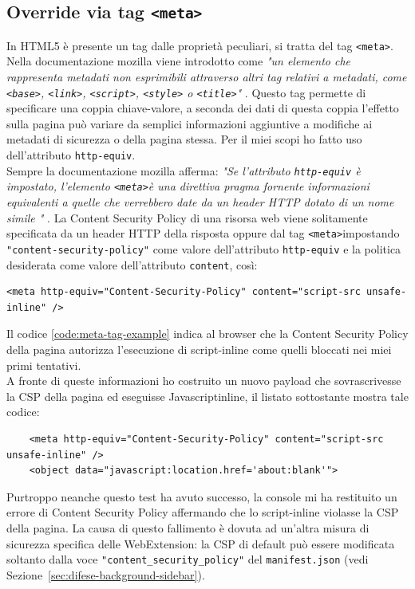 \documentclass{sapthesis}
\newcommand{\code}[1]{\texttt{#1}}
\newcommand{\refSection}[1]{Sezione~\ref{#1}}
\newcommand{\JS}{Javascript}
\newcommand{\manifest}{\code{manifest.json} }
\newcommand{\tagHTML}[1]{\code{<#1>}}
\newcommand{\meta}{\tagHTML{meta}}
\newcommand{\script}{\tagHTML{script}}
\begin{document}
        \subsection{Override via tag \meta}
        \label{sec:attaccando-vuln-bypass-meta}
            In HTML5 è presente un tag dalle proprietà peculiari, si tratta del tag \meta.
            Nella documentazione mozilla viene introdotto come \textit{"un elemento che rappresenta 
            metadati non esprimibili attraverso altri tag relativi a metadati, come \code{<base>}, 
            \code{<link>}, \script, \code{<style>} o \code{<title>}"} \cite{tag-meta}.
            Questo tag permette di specificare una coppia chiave-valore, a seconda dei dati di
            questa coppia l'effetto sulla pagina può variare da semplici informazioni aggiuntive
            a modifiche ai metadati di sicurezza o della pagina stessa. Per il miei scopi ho fatto
            uso dell'attributo \code{http-equiv}.\\
            Sempre la documentazione mozilla afferma: \textit{"Se l'attributo \code{http-equiv} è impostato,
            l'elemento \meta è una direttiva pragma fornente informazioni equivalenti a quelle che
            verrebbero date da un header HTTP dotato di un nome simile "} \cite{tag-meta}. La Content
            Security Policy di una risorsa web viene solitamente specificata da un header HTTP della
            risposta oppure dal tag \meta impostando \code{"content-security-policy"} come valore
            dell'attributo \code{http-equiv} e la politica desiderata come valore dell'attributo \code{content},
            così:
            \begin{lstlisting}[label=code:meta-tag-example]
<meta http-equiv="Content-Security-Policy" content="script-src unsafe-inline" />
            \end{lstlisting}
            Il codice \ref{code:meta-tag-example} indica al browser che la Content Security Policy della
            pagina autorizza l'esecuzione di script-inline come quelli bloccati nei miei primi tentativi.\\
            A fronte di queste informazioni ho costruito un nuovo payload che sovrascrivesse la CSP della
            pagina ed eseguisse \JS inline, il listato sottostante mostra tale codice:
            \begin{lstlisting}
    <meta http-equiv="Content-Security-Policy" content="script-src unsafe-inline" />
    <object data="javascript:location.href='about:blank'">
            \end{lstlisting}
            Purtroppo neanche questo test ha avuto successo, la console mi ha restituito un errore di Content
            Security Policy affermando che lo script-inline violasse la CSP della pagina. La causa
            di questo fallimento è dovuta ad un'altra misura di sicurezza specifica delle WebExtension: la CSP
            di default può essere modificata soltanto dalla voce \code{"content\_security\_policy"} del 
            \manifest (vedi \refSection{sec:difese-background-sidebar}).\\
        
\end{document}
